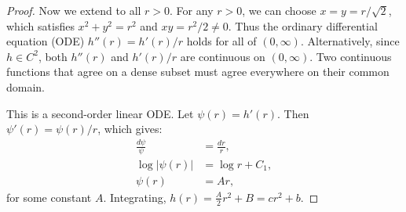 \documentclass[10pt,a4paper]{amsart}
\begin{document}
\begin{proof}
	Now we extend to all $r > 0$. For any $r > 0$, we can choose $x = y = r/\sqrt{2}$, which satisfies $x^2 + y^2 = r^2$ and $xy = r^2/2 \neq 0$. Thus the ordinary differential equation (ODE) $h''(r) = h'(r)/r$ holds for all of $(0, \infty)$. Alternatively, since $h \in C^2$, both $h''(r)$ and $h'(r)/r$ are continuous on $(0, \infty)$. Two continuous functions that agree on a dense subset must agree everywhere on their common domain.

	This is a second-order linear ODE\@. Let $\psi(r) = h'(r)$. Then $\psi'(r) = \psi(r)/r$, which gives:
	\begin{align*}
		\frac{d\psi}{\psi} & = \frac{dr}{r}, \\
		\log|\psi(r)|      & = \log r + C_1, \\
		\psi(r)            & = Ar,
	\end{align*}
	for some constant $A$. Integrating, $h(r) = \frac{A}{2} r^2 + B = cr^2 + b$.
\end{proof}
\end{document}

